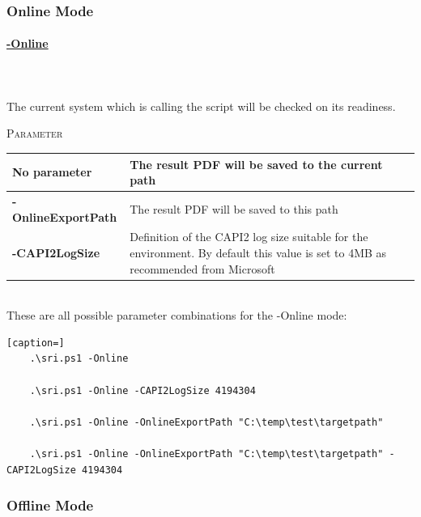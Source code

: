\subsubsection{Online Mode}

\begin{tcolorbox}
    \paragraph{\underline{-Online}} \ \\\\
    The current system which is calling the script will be checked on its readiness.
    \vspace{0.3cm}
    \begin{center}
        \textsc{Parameter}
    \end{center}
    \vspace{-0.5cm}
    \begin{table}[H]
        \def\arraystretch{2}
        \centering
        \begin{tabular}{ p{4cm}  p{10cm} }  \hline
            \textbf{No parameter} & The result PDF will be saved to the current path \\ \hline
            \textbf{-OnlineExportPath} & The result PDF will be saved to this path \\ \hline
            \textbf{-CAPI2LogSize} & Definition of the CAPI2 log size suitable for the environment. By default this value is set to 4MB as recommended from Microsoft  \\ \hline
        \end{tabular}
    \end{table}
\end{tcolorbox} \ \\
These are all possible parameter combinations for the -Online mode: \ \\
\begin{lstlisting}[caption=]
    .\sri.ps1 -Online	

    .\sri.ps1 -Online -CAPI2LogSize 4194304

    .\sri.ps1 -Online -OnlineExportPath "C:\temp\test\targetpath"

    .\sri.ps1 -Online -OnlineExportPath "C:\temp\test\targetpath" -CAPI2LogSize 4194304
\end{lstlisting}

\subsubsection{Offline Mode}

